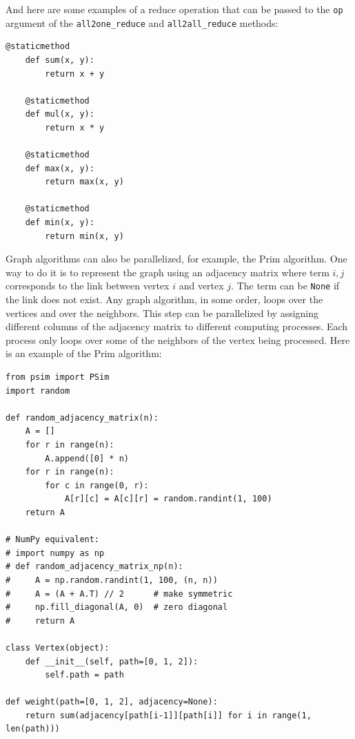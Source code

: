 \documentclass[justified, sixbynine]{tufte-book}
\def\ft{\small\tt}
\theoremstyle{plain}%
\newtheorem * {corollary}{Corollary}
\theoremstyle{definition}
\theoremstyle{remark}
\newtheorem * {remark}{Remark}
\newtheorem * {note}{Note}
\begin{document}
\begin{fullwidth}
And here are some examples of a reduce operation that can be passed to the {\ft op} argument of the {\ft all2one\_reduce} and {\ft all2all\_reduce} methods:

\begin{lstlisting}[caption={in file: {\ft psim.py}}]
    @staticmethod
    def sum(x, y):
        return x + y

    @staticmethod
    def mul(x, y):
        return x * y

    @staticmethod
    def max(x, y):
        return max(x, y)

    @staticmethod
    def min(x, y):
        return min(x, y)
\end{lstlisting}

Graph algorithms can also be parallelized, for example, the Prim algorithm. One way to do it is to represent the graph using an adjacency matrix where term $i, j$ corresponds to the link between vertex $i$ and vertex $j$. The term can be {\ft None} if the link does not exist. Any graph algorithm, in some order, loops over the vertices and over the neighbors. This step can be parallelized by assigning different columns of the adjacency matrix to different computing processes. Each process only loops over some of the neighbors of the vertex being processed. Here is an example of the Prim algorithm:

\begin{lstlisting}[caption={in file: {\ft psim\_prim.py}}]
from psim import PSim
import random

def random_adjacency_matrix(n):
    A = []
    for r in range(n):
        A.append([0] * n)
    for r in range(n):
        for c in range(0, r):
            A[r][c] = A[c][r] = random.randint(1, 100)
    return A

# NumPy equivalent:
# import numpy as np
# def random_adjacency_matrix_np(n):
#     A = np.random.randint(1, 100, (n, n))
#     A = (A + A.T) // 2      # make symmetric
#     np.fill_diagonal(A, 0)  # zero diagonal
#     return A

class Vertex(object):
    def __init__(self, path=[0, 1, 2]):
        self.path = path

def weight(path=[0, 1, 2], adjacency=None):
    return sum(adjacency[path[i-1]][path[i]] for i in range(1, len(path)))


\end{lstlisting}
\end{fullwidth}
\end{document}

